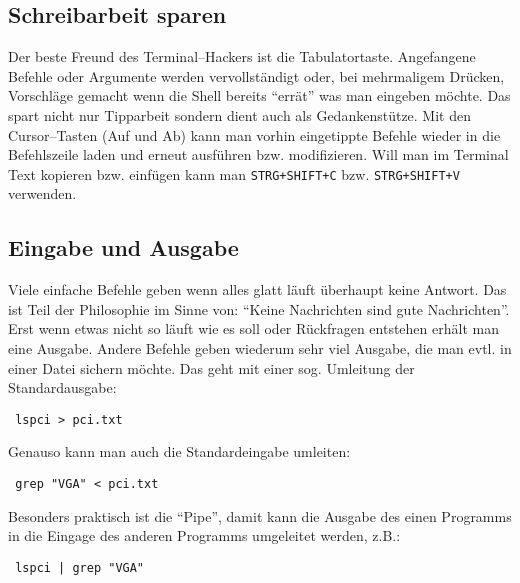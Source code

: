 \subsection{Schreibarbeit sparen}
Der beste Freund des Terminal--Hackers ist die Tabulatortaste. Angefangene Befehle oder Argumente werden vervollständigt oder, bei mehrmaligem Drücken, Vorschläge gemacht wenn die Shell bereits ``errät'' was man eingeben möchte. Das spart nicht nur Tipparbeit sondern dient auch als Gedankenstütze. Mit den Cursor--Tasten (Auf und Ab) kann man vorhin eingetippte Befehle wieder in die Befehlszeile laden und erneut ausführen bzw. modifizieren. Will man im Terminal Text kopieren bzw. einfügen kann man \lstinline|STRG+SHIFT+C| bzw. \lstinline|STRG+SHIFT+V| verwenden.

\subsection{Eingabe und Ausgabe}
Viele einfache Befehle geben wenn alles glatt läuft überhaupt keine Antwort. Das ist Teil der Philosophie im Sinne von: ``Keine Nachrichten sind gute Nachrichten''. Erst wenn etwas nicht so läuft wie es soll oder Rückfragen entstehen erhält man eine Ausgabe. Andere Befehle geben wiederum sehr viel Ausgabe, die man evtl. in einer Datei sichern möchte. Das geht mit einer sog. Umleitung der Standardausgabe:
\begin{lstlisting}
 lspci > pci.txt
\end{lstlisting}
Genauso kann man auch die Standardeingabe umleiten:
\begin{lstlisting}
 grep "VGA" < pci.txt
\end{lstlisting}
Besonders praktisch ist die ``Pipe'', damit kann die Ausgabe des einen Programms in die Eingage des anderen Programms umgeleitet werden, z.B.:
\begin{lstlisting}
 lspci | grep "VGA"
\end{lstlisting}